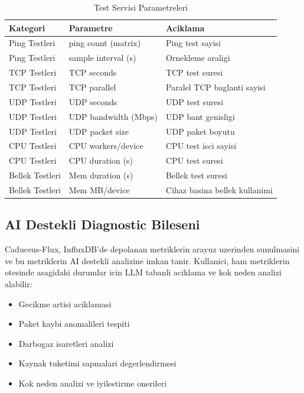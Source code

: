 \documentclass[conference]{IEEEtran}
\begin{document}
\begin{table}[htbp]
\caption{Test Servisi Parametreleri}
\label{tab:test_params}
\centering
\small
\begin{tabularx}{\linewidth}{l l Y}
\toprule
\textbf{Kategori} & \textbf{Parametre} & \textbf{Aciklama} \\
\midrule
Ping Testleri & ping count (matrix) & Ping test sayisi \\
Ping Testleri & sample interval (s) & Ornekleme araligi \\
TCP Testleri & TCP seconds & TCP test suresi \\
TCP Testleri & TCP parallel & Paralel TCP baglanti sayisi \\
UDP Testleri & UDP seconds & UDP test suresi \\
UDP Testleri & UDP bandwidth (Mbps) & UDP bant genisligi \\
UDP Testleri & UDP packet size & UDP paket boyutu \\
CPU Testleri & CPU workers/device & CPU test isci sayisi \\
CPU Testleri & CPU duration (s) & CPU test suresi \\
Bellek Testleri & Mem duration (s) & Bellek test suresi \\
Bellek Testleri & Mem MB/device & Cihaz basina bellek kullanimi \\
\bottomrule
\end{tabularx}
\end{table}

\subsection{AI Destekli Diagnostic Bileseni}
Caduceus-Flux, InfluxDB'de depolanan metriklerin arayuz uzerinden sunulmasini ve bu metriklerin AI destekli analizine imkan tanir. Kullanici, ham metriklerin otesinde asagidaki durumlar icin LLM tabanli aciklama ve kok neden analizi alabilir:
\begin{itemize}
\item Gecikme artisi aciklamasi
\item Paket kaybi anomalileri tespiti
\item Darbogaz isaretleri analizi
\item Kaynak tuketimi sapmalari degerlendirmesi
\item Kok neden analizi ve iyilestirme onerileri
\end{itemize}
\end{document}
